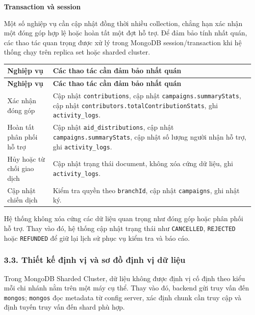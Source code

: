 \documentclass[12pt,a4paper]{article}
\begin{document}
\textbf{Transaction và session}

Một số nghiệp vụ cần cập nhật đồng thời nhiều collection, chẳng hạn xác nhận một đóng góp hợp lệ hoặc hoàn tất một đợt hỗ trợ. Để đảm bảo tính nhất quán, các thao tác quan trọng được xử lý trong MongoDB session/transaction khi hệ thống chạy trên replica set hoặc sharded cluster.

\begin{center}
\small
\begin{longtable}{|p{3.7cm}|p{8.8cm}|}
\hline
\textbf{Nghiệp vụ} & \textbf{Các thao tác cần đảm bảo nhất quán} \\ \hline
\endfirsthead
\hline
\textbf{Nghiệp vụ} & \textbf{Các thao tác cần đảm bảo nhất quán} \\ \hline
\endhead
Xác nhận đóng góp & Cập nhật \texttt{contributions}, cập nhật \texttt{campaigns.summaryStats}, cập nhật \texttt{contributors.totalContributionStats}, ghi \texttt{activity\_logs}. \\ \hline
Hoàn tất phân phối hỗ trợ & Cập nhật \texttt{aid\_distributions}, cập nhật \texttt{campaigns.summaryStats}, cập nhật số lượng người nhận hỗ trợ, ghi \texttt{activity\_logs}. \\ \hline
Hủy hoặc từ chối giao dịch & Cập nhật trạng thái document, không xóa cứng dữ liệu, ghi \texttt{activity\_logs}. \\ \hline
Cập nhật chiến dịch & Kiểm tra quyền theo \texttt{branchId}, cập nhật \texttt{campaigns}, ghi nhật ký. \\ \hline
\end{longtable}
\normalsize
\end{center}

Hệ thống không xóa cứng các dữ liệu quan trọng như đóng góp hoặc phân phối hỗ trợ. Thay vào đó, hệ thống cập nhật trạng thái như \texttt{CANCELLED}, \texttt{REJECTED} hoặc \texttt{REFUNDED} để giữ lại lịch sử phục vụ kiểm tra và báo cáo.

\subsubsection*{3.3. Thiết kế định vị và sơ đồ định vị dữ liệu}

Trong MongoDB Sharded Cluster, dữ liệu không được định vị cố định theo kiểu mỗi chi nhánh nằm trên một máy cụ thể. Thay vào đó, backend gửi truy vấn đến \texttt{mongos}; \texttt{mongos} đọc metadata từ config server, xác định chunk cần truy cập và định tuyến truy vấn đến shard phù hợp.
\end{document}
